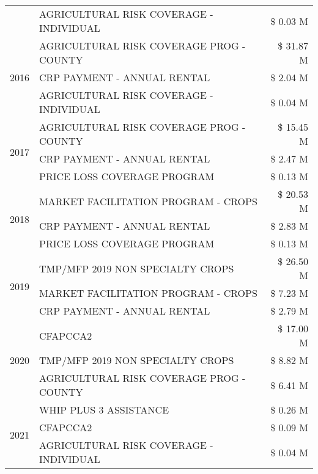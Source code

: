 \begin{tabular}{llr}
 & AGRICULTURAL RISK COVERAGE - INDIVIDUAL & \$ 0.03 M \\
\cline{1-3}
\multirow[t]{3}{*}{2016} & AGRICULTURAL RISK COVERAGE PROG - COUNTY      & \$ 31.87 M \\
 & CRP PAYMENT - ANNUAL RENTAL                   & \$ 2.04 M \\
 & AGRICULTURAL RISK COVERAGE - INDIVIDUAL       & \$ 0.04 M \\
\cline{1-3}
\multirow[t]{3}{*}{2017} & AGRICULTURAL RISK COVERAGE PROG - COUNTY & \$ 15.45 M \\
 & CRP PAYMENT - ANNUAL RENTAL & \$ 2.47 M \\
 & PRICE LOSS COVERAGE PROGRAM & \$ 0.13 M \\
\cline{1-3}
\multirow[t]{3}{*}{2018} & MARKET FACILITATION PROGRAM - CROPS & \$ 20.53 M \\
 & CRP PAYMENT - ANNUAL RENTAL & \$ 2.83 M \\
 & PRICE LOSS COVERAGE PROGRAM & \$ 0.13 M \\
\cline{1-3}
\multirow[t]{3}{*}{2019} & TMP/MFP 2019 NON SPECIALTY CROPS & \$ 26.50 M \\
 & MARKET FACILITATION PROGRAM - CROPS & \$ 7.23 M \\
 & CRP PAYMENT - ANNUAL RENTAL & \$ 2.79 M \\
\cline{1-3}
\multirow[t]{3}{*}{2020} & CFAPCCA2 & \$ 17.00 M \\
 & TMP/MFP 2019 NON SPECIALTY CROPS & \$ 8.82 M \\
 & AGRICULTURAL RISK COVERAGE PROG - COUNTY & \$ 6.41 M \\
\cline{1-3}
\multirow[t]{3}{*}{2021} & WHIP PLUS 3 ASSISTANCE & \$ 0.26 M \\
 & CFAPCCA2 & \$ 0.09 M \\
 & AGRICULTURAL RISK COVERAGE - INDIVIDUAL & \$ 0.04 M \\
\cline{1-3}
\bottomrule
\end{tabular}
